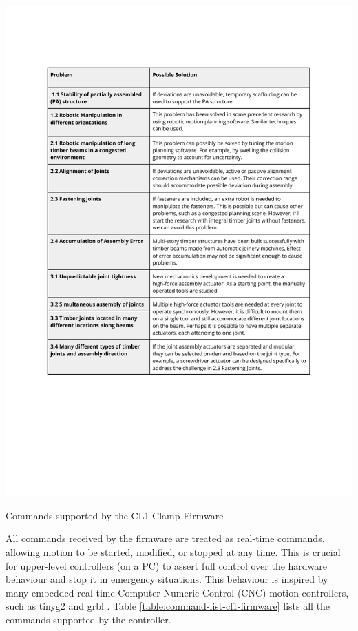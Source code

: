 \begin{table}[thb]
    \includegraphics[page=8, trim=25.4mm 130mm 25.4mm 33mm, clip, width=\textwidth]{tables/Tables in Chapter 4.pdf}
    \caption{Commands supported by the CL1 Clamp Firmware}
    \label{table:command-list-cl1-firmware}
\end{table}


All commands received by the firmware are treated as real-time commands, allowing motion to be started, modified, or stopped at any time. This is crucial for upper-level controllers (on a PC) to assert full control over the hardware behaviour and stop it in emergency situations. This behaviour is inspired by many embedded real-time Computer Numeric Control (CNC) motion controllers, such as tinyg2 \parencite{G2core2023} and grbl \parencite{jeonGrbl2019}. 
Table \ref{table:command-list-cl1-firmware} lists all the commands supported by the controller.


